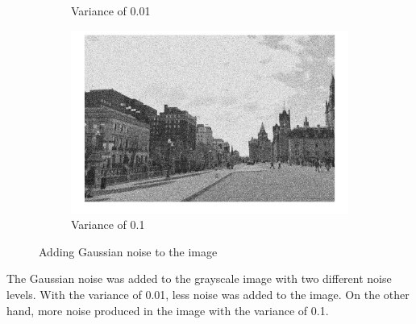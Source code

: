 \documentclass[conference]{IEEEtran}
\begin{document}
\begin{figure}[h!]
\begin{subfigure}[b]{0.4\linewidth}
\caption{Variance of 0.01}
\end{subfigure}
\begin{subfigure}[b]{0.4\linewidth}
\includegraphics[width=\linewidth]{images/img16.jpg}
\caption{Variance of 0.1}
\end{subfigure}
\caption{Adding Gaussian noise to the image}
\label{fig:Gaussian noise}
\end{figure}

The Gaussian noise was added to the grayscale image with two different noise levels. With the variance of 0.01, less noise was added to the image. On the other hand, more noise produced in the image with the variance of 0.1.
\end{document}
